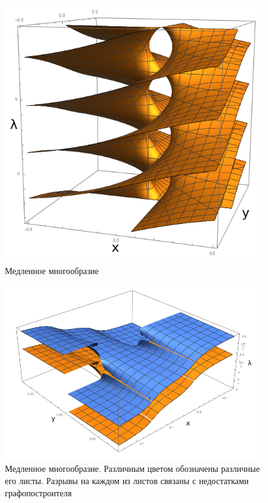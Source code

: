 \begin{figure}[H]
\centering
\includegraphics[scale=0.45]{img/MM.png}
\caption{Медленное многообразие}
\end{figure}

\begin{figure}[H]
\centering
\includegraphics[scale=0.45]{img/MM2.png}
\caption{Медленное многообразие. Различным цветом обозначены различные его листы. Разрывы на каждом из листов связаны с недостатками графопостроителя}
\end{figure}


